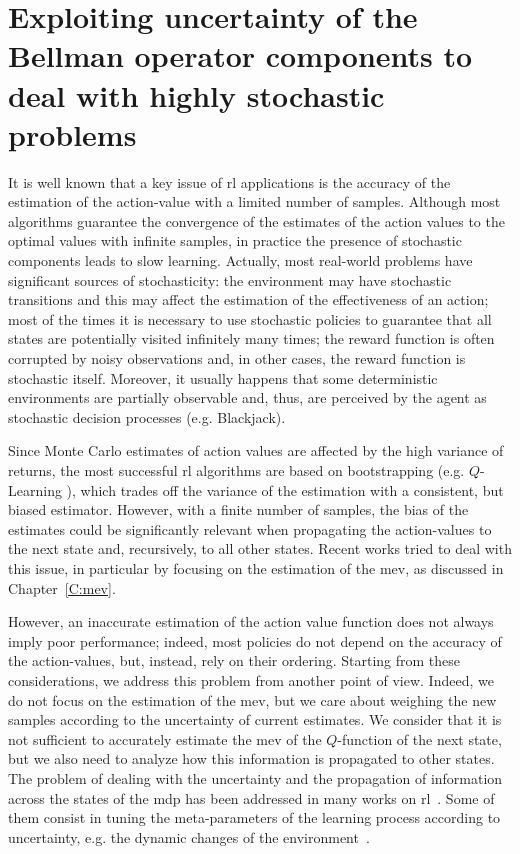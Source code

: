 \chapter{Exploiting uncertainty of the Bellman operator components to deal with highly stochastic problems}\label{C:rq}
It is well known that a key issue of \gls{rl} applications is the accuracy of the estimation of the action-value with a limited number of samples. Although most algorithms guarantee the convergence of the estimates of the action values to the optimal values with infinite samples, in practice the presence of stochastic components leads to slow learning. Actually, most real-world problems have significant sources of stochasticity: the environment may have stochastic transitions and this may affect the estimation of the effectiveness of an action; most of the times it is necessary to use stochastic policies to guarantee that all states are potentially visited infinitely many times; the reward function is often corrupted by noisy observations and, in other cases, the reward function is stochastic itself. Moreover, it usually happens that some deterministic environments are partially observable and, thus, are perceived by the agent as stochastic decision processes (e.g. Blackjack).

Since Monte Carlo estimates of action values are affected by the high variance of returns, the most successful \gls{rl} algorithms are based on bootstrapping (e.g. $Q$-Learning \cite{watkins1989learning}), which trades off the variance of the estimation with a consistent, but biased estimator. However, with a finite number of samples, the bias of the estimates could be significantly relevant when propagating the action-values to the next state and, recursively, to all other states. Recent works tried to deal with this issue, in particular by focusing on the estimation of the \gls{mev}, as discussed in Chapter~\ref{C:mev}. 

However, an inaccurate estimation of the action value function does not always imply poor performance; indeed, most policies do not depend on the accuracy of the action-values, but, instead, rely on their ordering. Starting from these considerations, we address this problem from another point of view. Indeed, we do not focus on the estimation of the \gls{mev}, but we care about weighing the new samples according to the uncertainty of current estimates. 
We consider that it is not sufficient to accurately estimate the \gls{mev} of the $Q$-function of the next state, but we also need to analyze how this information is propagated to other states. The problem of dealing with the uncertainty and the propagation of information across the states of the \gls{mdp} has been addressed in many works on \gls{rl}~\cite{mohagheghi2007proportional, Tewari2007}. Some of them consist in tuning the meta-parameters of the learning process according to uncertainty, e.g. the dynamic changes of the environment~\cite{schweighofer2003meta, Kobayashi2009, yoshida2013reinforcement}.

